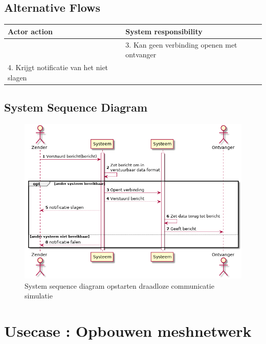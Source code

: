 \documentclass[a4paper, 11pt, oneside]{report}
\begin{document}
\subsection{Alternative Flows}

\begin{table}[H]
	\centering
	\begin{tabular}{|l|l|}
		\hline
		\rowcolor[HTML]{C0C0C0} 
		Actor action  & System responsibility   \\ \hline
		& 3. Kan geen verbinding openen met ontvanger                        \\ \hline
	4. Krijgt notificatie van het niet slagen	&                         \\ \hline
	\end{tabular}
\end{table}



\subsection{System Sequence Diagram }
\label{Usecase:communicerendata:systemsequence}

\begin{figure}[H]
	\begin{center}\includegraphics[height=.4\textheight]{UML/out/usecase/sequence/VersturenBericht/VersturenBericht.png}\end{center}
	\caption{System sequence diagram opstarten draadloze communicatie simulatie}
	\label{fig:communicerendata:systemsequence}
\end{figure}

\section[Opbouwen meshnetwerk]{Usecase : Opbouwen meshnetwerk}
\label{Usecase:opbouwenmeshnetwerk}
\end{document}
